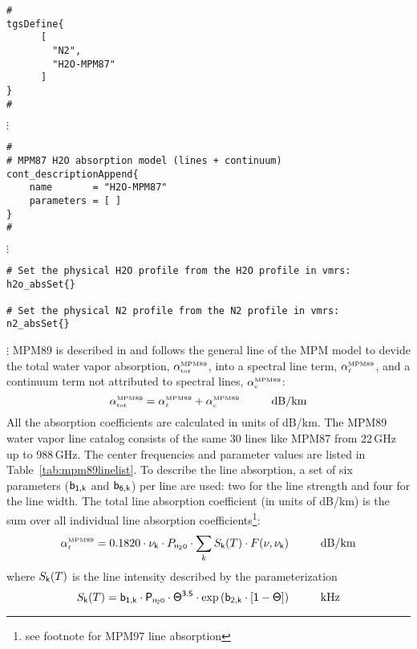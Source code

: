 
\begin{verbatim}
#
tgsDefine{
      [ 
        "N2",
        "H2O-MPM87"
      ] 
}
#
\end{verbatim}
$\vdots$
\begin{verbatim}
#
# MPM87 H2O absorption model (lines + continuum)
cont_descriptionAppend{
    name       = "H2O-MPM87"
    parameters = [ ]
}
#
\end{verbatim}
$\vdots$
\begin{verbatim}
# Set the physical H2O profile from the H2O profile in vmrs:
h2o_absSet{}

# Set the physical N2 profile from the N2 profile in vmrs:
n2_absSet{}
\end{verbatim}
$\vdots$
%
%
%
% 
\label{leveld:mpm89}
%
MPM89 is described in \cite{liebe:89} and follows the general line 
of the MPM model to devide the total water vapor absorption, 
$\alpha^{\mbox{\rm \tiny MPM89}}_{\mbox{\tiny tot}}$, into a spectral line term, $\alpha^{\mbox{\rm \tiny MPM89}}_{\mbox{\tiny $\ell$}}$, and a continuum 
term not attributed to spectral lines, $\alpha^{\mbox{\rm \tiny MPM89}}_{\mbox{\tiny c}}$:
\begin{equation}
  \label{eq:mpm89_abs}
  \alphampmmtot = \alphampmml + \alphampmmc\hspace*{10mm}\mbox{dB/km}
\end{equation}
All the absorption coefficients are calculated in units of \mbox{dB/km}.
%
%
\label{levele:h2o_mpm89_lines}
The MPM89 water vapor line catalog consists of the same 30 lines 
like MPM87 from 22\,GHz up to 988\,GHz. The center frequencies and parameter 
values are listed in Table~\ref{tab:mpm89linelist}. To describe the line 
absorption, a set of six parameters ($\sf b_{\sf 1,k}$ and $\sf b_{\sf 6,k}$) per line are used: two 
for the line strength and four for the line width. The total line 
absorption coefficient (in units of dB/km) is the sum over all
individual line absorption coefficients\footnote{see footnote for
  MPM97 line absorption}:
\begin{equation}
  \label{eq:mpm89:absline}
  \alphampmml = 0.1820 \cdot \nuk \cdot \phzo \cdot 
  \sum_{k}{\inten \cdot \shape}\hspace*{10mm}\mbox{dB/km}
\end{equation}
where $S_{\sf k}(T)$ is the line intensity described by the parameterization
\begin{equation}
  \label{eq:mpm89:strength}
  \inten = \bek \cdot \phzo \cdot \Theta^{3.5} 
           \cdot \exp{(\bzk \cdot [1-\Theta])}\hspace*{10mm}\mbox{kHz}
\end{equation}
